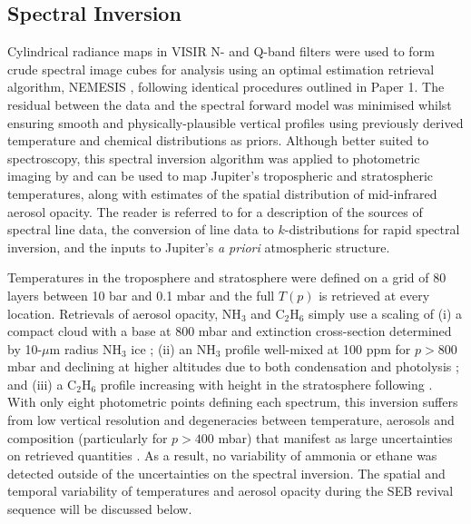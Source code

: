 \documentclass[final,authoryear,5p,times,twocolumn]{elsarticle}
\begin{document}
\subsection{Spectral Inversion}
Cylindrical radiance maps in VISIR N- and Q-band filters were used to form crude spectral image cubes for analysis using an optimal estimation retrieval algorithm, NEMESIS \citep{08irwin}, following identical procedures outlined in Paper 1.  The residual between the data and the spectral forward model was minimised whilst ensuring smooth and physically-plausible vertical profiles using previously derived temperature and chemical distributions as priors.  Although better suited to spectroscopy, this spectral inversion algorithm was applied to photometric imaging by \citet{09fletcher_imaging} and can be used to map Jupiter's tropospheric and stratospheric temperatures, along with estimates of the spatial distribution of mid-infrared aerosol opacity.  The reader is referred to \citet{09fletcher_imaging} for a description of the sources of spectral line data, the conversion of line data to $k$-distributions for rapid spectral inversion, and the inputs to Jupiter's \textit{a priori} atmospheric structure.  

Temperatures in the troposphere and stratosphere were defined on a grid of 80 layers between 10 bar and 0.1 mbar and the full $T(p)$ is retrieved at every location.  Retrievals of aerosol opacity, NH$_3$ and C$_2$H$_6$ simply use a scaling of (i) a compact cloud with a base at 800 mbar and extinction cross-section determined by 10-$\mu$m radius NH$_3$ ice \citep{09fletcher_ph3}; (ii) an NH$_3$ profile well-mixed at 100 ppm for $p>800$ mbar and declining at higher altitudes due to both condensation and photolysis \citep[e.g.,][]{06achterberg}; and (iii) a C$_2$H$_6$ profile increasing with height in the stratosphere following \citet{07nixon}.  With only eight photometric points defining each spectrum, this inversion suffers from low vertical resolution and degeneracies between temperature, aerosols and composition (particularly for $p>400$ mbar) that manifest as large uncertainties on retrieved quantities \citep{09fletcher_imaging}.  As a result, no variability of ammonia or ethane was detected outside of the uncertainties on the spectral inversion.  The spatial and temporal variability of temperatures and aerosol opacity during the SEB revival sequence will be discussed below.  

\end{document}
